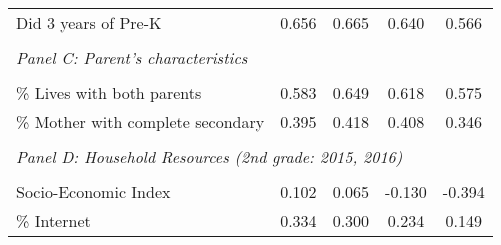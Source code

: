 {\begin{tabular}{lcccc}
Did 3 years of Pre-K&       0.656&       0.665&       0.640&       0.566\\
&  &  &   \\
\multicolumn{4}{l}{\textit{Panel C: Parent's characteristics}} \\
            &            &            &            &            \\
\% Lives with both parents&       0.583&       0.649&       0.618&       0.575\\
\% Mother with complete secondary&       0.395&       0.418&       0.408&       0.346\\
&  &  &   \\
\multicolumn{4}{l}{\textit{Panel D: Household Resources (2nd grade: 2015, 2016)}} \\
            &            &            &            &            \\
Socio-Economic Index         &       0.102&       0.065&      -0.130&      -0.394\\
\% Internet &       0.334&       0.300&       0.234&       0.149\\

\end{tabular}}
